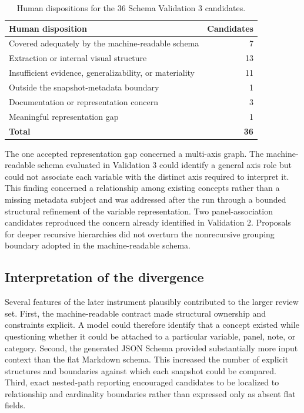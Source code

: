 \documentclass{article}
\begin{document}
\begin{table}[H]
    \centering
    \caption{Human dispositions for the 36 Schema Validation 3 candidates.}
    \label{tab:validation3_adjudication}
    \renewcommand{\arraystretch}{1.1}
    \small
    \begin{tabularx}{0.82\textwidth}{>{\RaggedRight\arraybackslash}X r}
        \toprule
        \textbf{Human disposition} & \textbf{Candidates} \\
        \midrule
        Covered adequately by the machine-readable schema & 7 \\
        Extraction or internal visual structure & 13 \\
        Insufficient evidence, generalizability, or materiality & 11 \\
        Outside the snapshot-metadata boundary & 1 \\
        Documentation or representation concern & 3 \\
        Meaningful representation gap & 1 \\
        \midrule
        \textbf{Total} & \textbf{36} \\
        \bottomrule
    \end{tabularx}
\end{table}

The one accepted representation gap concerned a multi-axis graph. The machine-readable schema evaluated in Validation 3 could identify a general axis role but could not associate each variable with the distinct axis required to interpret it. This finding concerned a relationship among existing concepts rather than a missing metadata subject and was addressed after the run through a bounded structural refinement of the variable representation. Two panel-association candidates reproduced the concern already identified in Validation 2. Proposals for deeper recursive hierarchies did not overturn the nonrecursive grouping boundary adopted in the machine-readable schema.

\subsection{Interpretation of the divergence}

Several features of the later instrument plausibly contributed to the larger review set. First, the machine-readable contract made structural ownership and constraints explicit. A model could therefore identify that a concept existed while questioning whether it could be attached to a particular variable, panel, note, or category. Second, the generated JSON Schema provided substantially more input context than the flat Markdown schema. This increased the number of explicit structures and boundaries against which each snapshot could be compared. Third, exact nested-path reporting encouraged candidates to be localized to relationship and cardinality boundaries rather than expressed only as absent flat fields.
\end{document}

